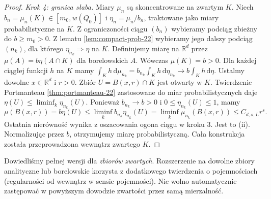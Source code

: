 \begin{proof}
\emph{Krok 4: granica słaba.} Miary $\mu_n$ są skoncentrowane na zwartym $K$.
Niech $b_n=\mu_n(K)\in[m_0,w(Q_0)]$ i
$\eta_n=\mu_n/b_n$, traktowane jako miary probabilistyczne na $K$.
Z ograniczoności ciągu $(b_n)$ wybieramy podciąg zbieżny
do $b\ge m_0>0$. Z lematu \ref{lem:compact-prob-22}
wybieramy jego dalszy podciąg $(n_k)$, dla którego
$\eta_{n_k}\Rightarrow\eta$ na $K$.
Definiujemy miarę na $\mathbb R^d$ przez
$\mu(A)=b\eta(A\cap K)$ dla borelowskich $A$.
Wówczas $\mu(K)=b>0$. Dla każdej ciągłej funkcji $h$ na $K$
mamy $\int_K h\,\mathrm d\mu_{n_k}=b_{n_k}\int_K h\,\mathrm d\eta_{n_k}\to b\int_K h\,\mathrm d\eta$.
Ustalmy dowolne $x\in\mathbb R^d$ i $r>0$.
Zbiór $U=B(x,r)\cap K$ jest otwarty w $K$.
Twierdzenie Portmanteau \ref{thm:portmanteau-22}
zastosowane do miar probabilistycznych daje
$\eta(U)\le\liminf_k\eta_{n_k}(U)$. Ponieważ
$b_{n_k}\to b>0$ i $0\le\eta_{n_k}(U)\le1$, mamy
\[
 \mu(B(x,r))=b\eta(U)\le
 \liminf_k b_{n_k}\eta_{n_k}(U)
 =\liminf_k\mu_{n_k}(B(x,r))\le C_{d,s,L}r^s.
\]
Ostatnia nierówność wynika z oszacowania ogona ciągu
w kroku 3. Jest to (ii). Normalizując przez $b$,
otrzymujemy miarę probabilistyczną. Cała konstrukcja została
przeprowadzona wewnątrz zwartego $K$.
\end{proof}

\begin{uwaga}
Dowiedliśmy pełnej wersji dla \emph{zbiorów zwartych}.
Rozszerzenie na dowolne zbiory analityczne lub borelowskie
korzysta z dodatkowego twierdzenia o pojemnościach
(regularności od wewnątrz w sensie pojemności).
Nie wolno automatycznie zastępować w powyższym dowodzie
zwartości przez samą mierzalność.
\end{uwaga}

